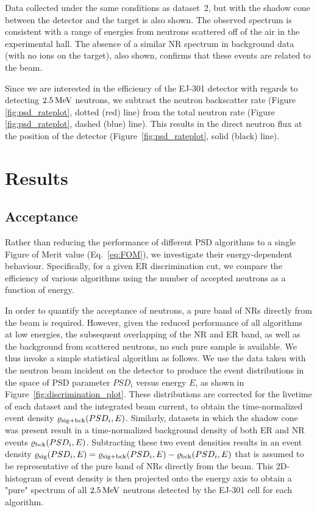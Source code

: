 Data collected under the same conditions as dataset~2, but with the shadow cone between the detector and the target is also shown. The observed spectrum is consistent with a range of energies from neutrons scattered off of the air in the experimental hall. The absence of a similar NR spectrum in background data (with no ions on the target), also shown, confirms that these events are related to the beam.

Since we are interested in the efficiency of the EJ-301 detector with regards to detecting $2.5\,\mathrm{MeV}$ neutrons, we subtract the neutron backscatter rate (Figure \ref{fig:psd_rateplot}, dotted (red) line) from the total neutron rate (Figure \ref{fig:psd_rateplot}, dashed (blue) line). This results in the direct neutron flux at the position of the detector (Figure~\ref{fig:psd_rateplot}, solid (black) line).

\section{Results}\label{sec:psd_acceptance}

\subsection{Acceptance}

Rather than reducing the performance of different PSD algorithms to a single Figure of Merit value (Eq.~\eqref{eq:FOM}), we investigate their energy-dependent behaviour. Specifically, for a given ER discrimination cut, we compare the efficiency of various algorithms using the number of accepted neutrons as a function of energy.

In order to quantify the acceptance of neutrons, a pure band of NRs directly from the beam is required. However, given the reduced performance of all algorithms at low energies, the subsequent overlapping of the NR and ER band, as well as the background from scattered neutrons, no such pure sample is available. We thus invoke a simple statistical algorithm as follows. We use the data taken with the neutron beam incident on the detector to produce the event distributions in the space of PSD parameter $PSD_i$ versus energy $E$, as shown in Figure~\ref{fig:discrimination_plot}. These distributions are corrected for the livetime of each dataset and the integrated beam current, to obtain the time-normalized event density $\varrho_{\mathrm{sig+bck}}(PSD_i,E)$. Similarly, datasets in which the shadow cone was present result in a time-normalized background density of both ER and NR events $\varrho_{\mathrm{bck}}(PSD_i,E)$. Subtracting these two event densities results in an event density $\varrho_{\mathrm{sig}}(PSD_i,E)=\varrho_{\mathrm{sig+bck}}(PSD_i,E)-\varrho_{\mathrm{bck}}(PSD_i,E)$ that is assumed to be representative of the pure band of NRs directly from the beam. This 2D-histogram of event density is then projected onto the energy axis to obtain a "pure" spectrum of all $2.5\,\mathrm{MeV}$ neutrons detected by the EJ-301 cell for each algorithm.

